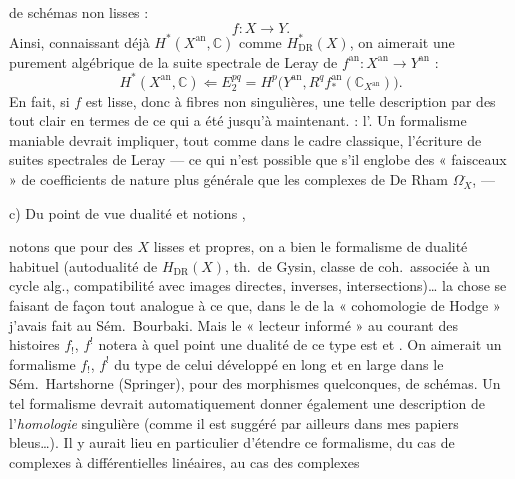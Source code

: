 \documentclass[11pt,a4paper]{article}
\begin{document}

de schémas non lisses : \struck{\ill{}}
\[
  f : X \to Y .
\]
Ainsi, connaissant déjà $H^{*}(X^{\mathrm{an}}, \mathbb{C})$ comme
$H^{*}_{\mathrm{DR}}(X)$, on aimerait une 
 purement algébrique de la suite spectrale de Leray de
$f^{\mathrm{an}} : X^{\mathrm{an}} \to Y^{\mathrm{an}}$ :
\[
  H^{*}(X^{\mathrm{an}}, \mathbb{C}) \Longleftarrow
  E_2^{pq} = H^{p}\bigl(Y^{\mathrm{an}},
  R^{q} f^{\mathrm{an}}_{*}(\mathbb{C}_{X^{\mathrm{an}}})\bigr) .
\]
En fait, si $f$ est lisse, donc à fibres non singulières, une telle
description  par des \ill{} tout clair en termes de ce
qui a été \ill{} jusqu'à maintenant.
  \ill{} \ill{} : l'. Un formalisme
 maniable devrait impliquer, tout comme dans le cadre
classique, l'écriture de suites spectrales de Leray --- ce qui n'est
possible que s'il englobe des « faisceaux » de coefficients de nature plus
générale que les complexes de De Rham $\Omega^{\cdot}_X$, --- 

c) Du point de vue dualité et notions ,


notons que pour des $X$ lisses et propres, on a bien le formalisme de
dualité habituel (autodualité de $H_{\mathrm{DR}}(X)$,  th.\ de
Gysin, classe de coh.\ associée à un cycle alg., compatibilité avec images
directes, inverses, intersections)\ldots{} la chose se faisant de façon tout
analogue à ce que, dans le  de la « cohomologie de Hodge »
j'avais fait au Sém.\ Bourbaki. Mais le « lecteur informé » au courant des
histoires $f_{!}$, $f^{!}$ notera à quel point une  dualité de
ce type est  et . On aimerait un
formalisme $f_{!}$, $f^{!}$ du type de celui développé en long et en large
dans le Sém.\ Hartshorne (Springer), \struck{\ill{}} pour des morphismes
 quelconques, de
schémas. Un tel formalisme  devrait \struck{\ill{}} automatiquement donner
également une description de l'\emph{homologie} singulière (comme il est
suggéré par ailleurs dans mes papiers bleus\ldots). Il y aurait lieu en
particulier d'étendre ce formalisme, du cas de complexes à différentielles
linéaires, au cas des complexes
\end{document}
